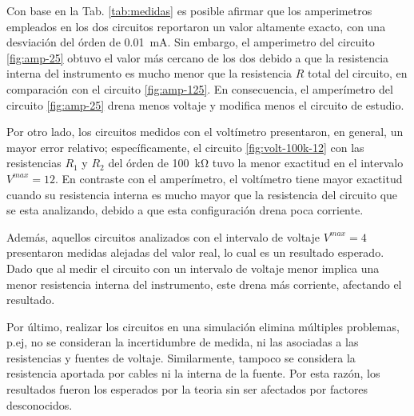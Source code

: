 Con base en la Tab. \ref{tab:medidas} es posible afirmar que los amperimetros
empleados en los dos circuitos reportaron un valor altamente exacto, con una
desviación del órden de \qty{0,01}{\milli\ampere}. Sin embargo, el amperimetro
del circuito \ref{fig:amp-25} obtuvo el valor m\'as cercano de los dos
debido a que la resistencia interna del instrumento es mucho menor que la
resistencia $R$ total del circuito, en comparación con el circuito
\ref{fig:amp-125}. En consecuencia, el amperímetro del circuito \ref{fig:amp-25}
drena menos voltaje y modifica menos el circuito de estudio.

Por otro lado, los circuitos medidos con el voltímetro presentaron, en general,
un mayor error relativo; específicamente, el circuito \ref{fig:volt-100k-12}
con las resistencias $R_1$ y $R_2$ del órden de \qty{100}{\kilo\ohm} tuvo la
menor exactitud en el intervalo $V^{max}=12$. En contraste con el
amperímetro, el volt\'imetro tiene mayor exactitud cuando su
resistencia interna es mucho mayor que la resistencia del circuito que se esta
analizando, debido a que esta configuración drena poca corriente.

Además, aquellos circuitos analizados con el intervalo de voltaje
$V^{max}=4$ presentaron medidas alejadas del valor real, lo cual es un
resultado esperado. Dado que al medir el circuito con un intervalo de voltaje menor
implica una menor resistencia interna del instrumento, este drena más corriente,
afectando el resultado.

Por último, realizar los circuitos en una simulación elimina múltiples problemas, p.ej,
no se consideran la incertidumbre de medida, ni las asociadas a las resistencias y
fuentes de voltaje. Similarmente, tampoco se considera la resistencia aportada por
cables ni la interna de la fuente. Por esta razón, los resultados fueron los esperados
por la teoria sin ser afectados por factores desconocidos.
